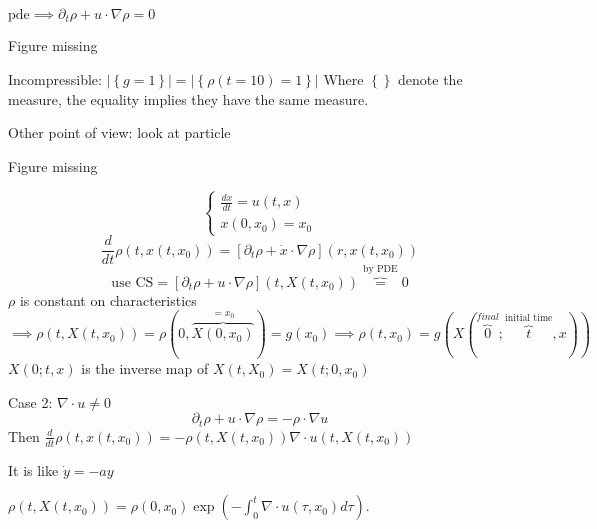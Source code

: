 \documentclass[a4paper]{article}
\theoremstyle{definition}
\begin{document}
	$\text{pde}\implies \partial_t \rho+u\cdot \nabla \rho=0$
	
	Figure missing

	Incompressible: $\left| \left\{ g=1 \right\} \right|=\left| \left\{ \rho\left( t=10 \right) =1 \right\}  \right|   $
	Where $\left\{  \right\}  $ denote the measure, the equality implies they have the same measure. 

	Other point of view: look at particle

	Figure missing

	\begin{equation}
		\begin{cases}
			\frac{dx}{dt}=u\left( t,x \right) \\
			x\left( 0,x_0 \right) =x_0
		\end{cases}
	\end{equation}
	\begin{equation}
		\frac{d}{dt}\rho\left( t,x\left( t,x_0 \right)  \right) =\left[ \partial_t\rho+\dot{x}\cdot \nabla \rho \right] \left( r,x\left( t,x_0 \right)  \right) 
	\end{equation} 
	\begin{equation}
		\text{use CS}=\left[ \partial_t\rho+u\cdot \nabla \rho \right] \left( t,X\left( t,x_0 \right)  \right) \overbrace{=}^{\text{by PDE}}0
	\end{equation} 
	$\rho$ is constant on characteristics $\implies \rho\left( t,X\left( t,x_0 \right)  \right) =\rho\left( 0,\overbrace{X\left( 0,x_0 \right) }^{=x_0} \right) =g\left( x_0 \right)\implies \rho\left( t,x_0 \right) =g\left( X\left( \overbrace{0}^{final};\overbrace{t}^{\text{initial time}},x \right)  \right) $ 
	$X\left( 0;t,x \right) $ is the inverse map of $X\left( t,X_0 \right) =X\left( t;0,x_0 \right) $

	Case 2: $\nabla \cdot u\neq 0$
	\begin{equation}
		\partial_t \rho+u\cdot \nabla \rho=-\rho\cdot \nabla u
	\end{equation} 
	Then $\frac{d}{dt}\rho\left( t,x\left( t,x_0 \right)  \right) =-\rho\left( t,X\left( t,x_0 \right)  \right) \nabla \cdot u\left( t,X\left( t,x_0 \right)  \right) $

	It is like $\dot{y}=-ay$

	$\rho\left( t,X\left( t,x_0 \right)  \right) =\rho\left( 0,x_0 \right) \exp\left( -\int_{0}^{t} \nabla \cdot u\left( \tau,x_0 \right) d\tau \right) $. 
\end{document}
